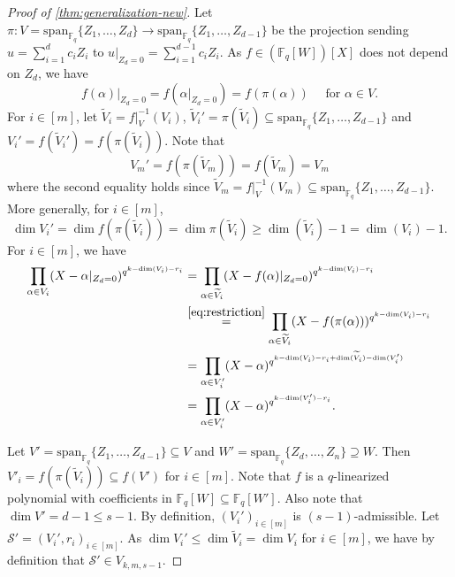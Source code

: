 \documentclass[11pt]{article}
\theoremstyle{plain}
\theoremstyle{definition}
\theoremstyle{remark}
\newcommand{\F}{\mathbb{F}}
\newcommand{\cS}{\mathcal{S}}
\begin{document}
\begin{proof}[Proof of \cref{thm:generalization-new}]
Let $\pi:V=\mathrm{span}_{\F_q}\{Z_1,\dots,Z_{d}\}\to \mathrm{span}_{\F_q}\{Z_1,\dots,Z_{d-1}\}$ be the projection sending $u=\sum_{i=1}^d c_i Z_i$ to $u|_{Z_d=0}=\sum_{i=1}^{d-1} c_i Z_i$.
As $f\in(\F_q[W])[X]$ does not depend on $Z_d$, we have 
\begin{equation}\label{eq:restriction}
f(\alpha)|_{Z_d=0}=f(\alpha|_{Z_d=0})=f(\pi(\alpha)) \quad\text{ for } \alpha\in V.   
\end{equation}
For $i\in [m]$, let $\widetilde{V}_i=f|_V^{-1}(V_i)$, $\widetilde{V}_i'=\pi(\widetilde{V}_i)\subseteq \mathrm{span}_{\F_q}\{Z_1,\dots,Z_{d-1}\}$ and $V_i'=f(\widetilde{V}_i')=f(\pi(\widetilde{V}_i))$. 
Note that
\begin{equation}\label{eq:unchanged}
V_m'=f(\pi(\widetilde{V}_m))=f(\widetilde{V}_m)=V_m
\end{equation}
where the second equality holds since $\widetilde{V}_m=f|_V^{-1}(V_m)\subseteq \mathrm{span}_{\F_q}\{Z_1,\dots,Z_{d-1}\}$.
More generally, for $i\in [m]$,
\begin{equation}\label{eq:decrease-by-one}
\dim V_i'=\dim f(\pi(\widetilde{V}_i))=\dim \pi(\widetilde{V}_i)\geq \dim(\widetilde{V}_i)-1=\dim (V_i)-1.
\end{equation}
For $i\in [m]$, we have
\begin{equation}\label{eq:assign}
\begin{aligned}
\prod_{\alpha\in V_i} (X-\alpha|_{Z_d=0})^{q^{k-\dim (V_i)-r_i}}&=\prod_{\alpha\in \widetilde{V}_i} (X-f(\alpha)|_{Z_d=0})^{q^{k-\dim (V_i)-r_i}}\\
&\stackrel{\eqref{eq:restriction}}{=}\prod_{\alpha\in \widetilde{V}_i} (X-f(\pi(\alpha)))^{q^{k-\dim (V_i)-r_i}}\\
&=\prod_{\alpha\in V_i'} (X-\alpha)^{q^{k-\dim (V_i)-r_i+\dim(\widetilde{V}_i)-\dim(V_i')}}\\
&=\prod_{\alpha\in V_i'} (X-\alpha)^{q^{k-\dim(V_i')-r_i}}.
\end{aligned}
\end{equation}

Let $V'=\mathrm{span}_{\F_q}\{Z_1,\dots,Z_{d-1}\}\subseteq V$ and $W'=\mathrm{span}_{\F_q}\{Z_d,\dots,Z_n\}\supseteq W$.
Then $V'_i=f(\pi(\widetilde{V}_i))\subseteq f(V')$ for $i\in [m]$. Note that $f$ is a $q$-linearized polynomial with coefficients in $\F_q[W]\subseteq \F_q[W']$.
Also note that $\dim V'=d-1\leq s-1$.
By definition, $(V_i')_{i\in [m]}$ is $(s-1)$-admissible.
Let $\cS'=(V_i', r_i)_{i\in [m]}$.
As $\dim V_i'\leq \dim \widetilde{V}_i=\dim V_i$ for $i\in [m]$, we have by definition that $\cS'\in V_{k,m,s-1}$.


\end{proof}
\end{document}
